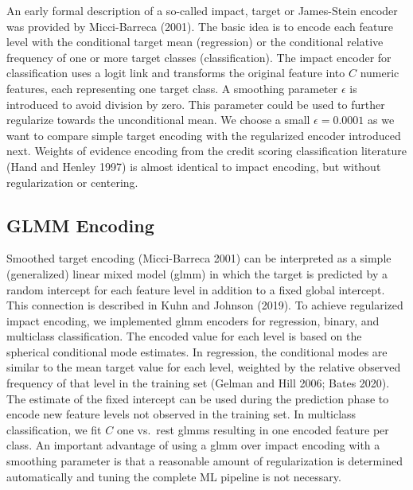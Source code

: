 \documentclass[smallextended]{svjour3}       %
\begin{document}
An early formal description of a so-called impact, target or James-Stein encoder was provided by Micci-Barreca (2001).
The basic idea is to encode each feature level with the conditional target mean (regression) or the conditional relative frequency of one or more target classes (classification).
The impact encoder for classification uses a logit link and transforms the original feature into \(C\) numeric features, each representing one target class.
A smoothing parameter \(\epsilon\) is introduced to avoid division by zero.
This parameter could be used to further regularize towards the unconditional mean.
We choose a small \(\epsilon = 0.0001\) as we want to compare simple target encoding with the regularized encoder introduced next.
Weights of evidence encoding from the credit scoring classification literature (Hand and Henley 1997) is almost identical to impact encoding, but without regularization or centering.

\hypertarget{glmm-encoding}{%
\subsection{GLMM Encoding}\label{glmm-encoding}}

Smoothed target encoding (Micci-Barreca 2001) can be interpreted as a simple (generalized) linear mixed model (glmm) in which the target is predicted by a random intercept for each feature level in addition to a fixed global intercept.
This connection is described in Kuhn and Johnson (2019).
To achieve regularized impact encoding, we implemented glmm encoders for regression, binary, and multiclass classification.
The encoded value for each level is based on the spherical conditional mode estimates.
In regression, the conditional modes are similar to the mean target value for each level, weighted by the relative observed frequency of that level in the training set (Gelman and Hill 2006; Bates 2020).
The estimate of the fixed intercept can be used during the prediction phase to encode new feature levels not observed in the training set.
In multiclass classification, we fit \(C\) one vs.~rest glmms resulting in one encoded feature per class.
An important advantage of using a glmm over impact encoding with a smoothing parameter is that a reasonable amount of regularization is determined automatically and tuning the complete ML pipeline is not necessary.
\end{document}
